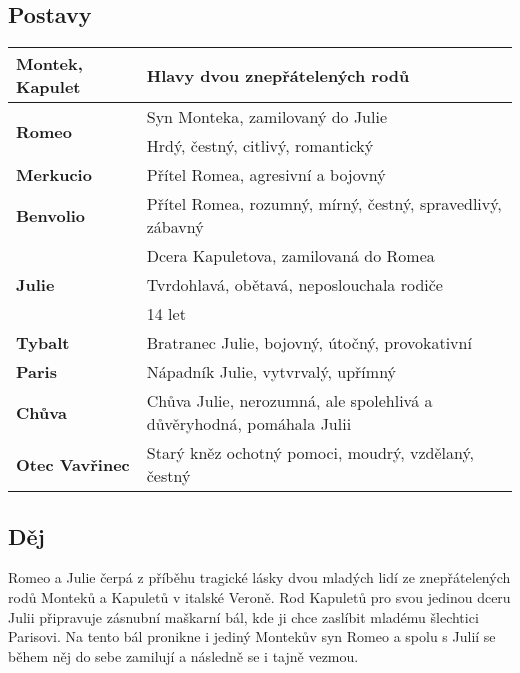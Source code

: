 \subsection*{Postavy}
\begin{tabularx}{\linewidth}{l|l}
  \textbf{Montek, Kapulet}           & Hlavy dvou znepřátelených rodů                                       \\
  \hline
  \multirow{2}{15em}{\textbf{Romeo}} & Syn Monteka, zamilovaný do Julie                                     \\
                                     & Hrdý, čestný, citlivý, romantický                                    \\
  \hline
  \textbf{Merkucio}                  & Přítel Romea, agresivní a bojovný                                    \\
  \hline
  \textbf{Benvolio}                  & Přítel Romea, rozumný, mírný, čestný, spravedlivý, zábavný           \\
  \hline
  \multirow{3}{15em}{\textbf{Julie}} & Dcera Kapuletova, zamilovaná do Romea                                \\
                                     & Tvrdohlavá, obětavá, neposlouchala rodiče                            \\
                                     & 14 let                                                               \\
  \hline
  \textbf{Tybalt}                    & Bratranec Julie, bojovný, útočný, provokativní                       \\
  \hline
  \textbf{Paris}                     & Nápadník Julie, vytvrvalý, upřímný                                   \\
  \hline
  \textbf{Chůva}                     & Chůva Julie, nerozumná, ale spolehlivá a důvěryhodná, pomáhala Julii \\
  \hline
  \textbf{Otec Vavřinec}             & Starý kněz ochotný pomoci, moudrý, vzdělaný, čestný                  \\
\end{tabularx}
\subsection*{Děj}
Romeo a Julie čerpá z příběhu tragické lásky dvou mladých lidí ze znepřátelených rodů Monteků a Kapuletů v italské Veroně.
Rod Kapuletů pro svou jedinou dceru Julii připravuje zásnubní maškarní bál, kde ji chce zaslíbit mladému šlechtici Parisovi.
Na tento bál pronikne i jediný Montekův syn Romeo a spolu s Julií se během něj do sebe zamilují a následně se i tajně vezmou.

